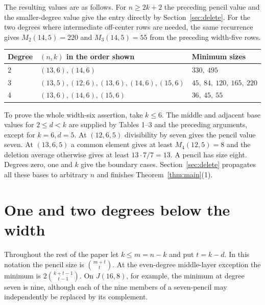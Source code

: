 \documentclass[11pt,letterpaper]{article}
\numberwithin{equation}{section}
\begin{document}
The resulting values are as follows. For $n\ge2k+2$ the preceding pencil value and the
smaller-degree value give the entry directly by Section~\ref{sec:delete}. For the two degrees
where intermediate off-center rows are needed, the same recurrence gives $M_{2}(14,5)=220$ and
$M_{3}(14,5)=55$ from the preceding width-five rows.

\begin{center}\normalfont
\begin{tabularx}{\linewidth}{@{}lXl@{}}
\toprule
Degree & $(n,k)$ in the order shown & Minimum sizes \\
\midrule
2 & $(13,6),(14,6)$ & $330,\ 495$ \\
3 & $(13,5),(12,6),(13,6),(14,6),(15,6)$ & $45,\ 84,\ 120,\ 165,\ 220$ \\
4 & $(13,6),(14,6),(15,6)$ & $36,\ 45,\ 55$ \\
\bottomrule
\end{tabularx}
\end{center}

To prove the whole width-six assertion, take $k\le6$. The middle and adjacent base values for
$2\le d<k$ are supplied by Tables 1--3 and the preceding arguments, except for $k=6,d=5$. At
$(12,6,5)$ divisibility by seven gives the pencil value seven. At $(13,6,5)$ a common element
gives at least $M_{4}(12,5)=8$ and the deletion average otherwise gives at least
$13\cdot7/7=13$. A pencil has size eight. Degrees zero, one and $k$ give the boundary cases.
Section~\ref{sec:delete} propagates all these bases to arbitrary $n$ and finishes
Theorem~\ref{thm:main}(1).

\section{One and two degrees below the width}\label{sec:high}

Throughout the rest of the paper let $k\le m=n-k$ and put $t=k-d$. In this notation the pencil
size is $\binom{m+t}{t}$. At the even-degree middle-layer exception the minimum is
$2\binom{k+t-1}{t-1}$. On $J(16,8)$, for example, the minimum at degree seven is nine, although
each of the nine members of a seven-pencil may independently be replaced by its complement.
\end{document}
